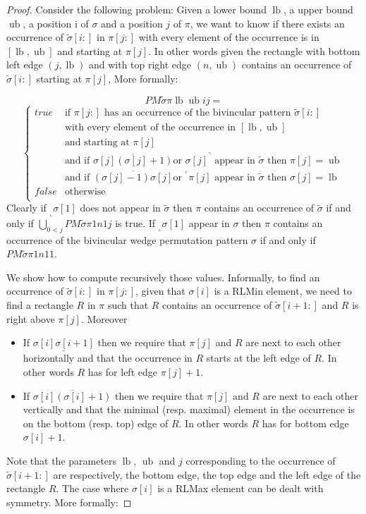 \documentclass[a4paper]{llncs}
\newcommand{\ptext}{\pi}
\newcommand{\PM}{PM}
\DeclareMathOperator{\lb}{lb}
\DeclareMathOperator{\ub}{ub}
\begin{document}
\begin{proof}
Consider the following problem:
Given a lower bound $\lb$, a upper bound $\ub$, a position i of $\sigma$
and a position $j$ of $\pi$, we want to know if
there exists an occurrence of $\widetilde{\sigma}[i:]$ in $\ptext[j:]$
with every element of the occurrence is in $[\lb,\ub]$
and starting at $\pi[j]$.
In other words given the rectangle with bottom left edge
$(j,\lb)$ and with top right edge $(n,\ub)$
contains an occurrence of $\widetilde{\sigma}[i:]$
starting at $\pi[j]$,
More formally:

$$
\PM{\widetilde{\sigma}}{\ptext}{\lb}{\ub}{i}{j}=
$$
$$
\begin{cases}
	true 	& \text{if $\ptext[j:]$ has an occurrence of the bivincular pattern $\widetilde{\sigma}[i:]$ }\\
			& \text{with every element of the occurrence in $[\lb,\ub]$}\\
			& \text{and starting at $\pi[j]$}\\
			& \text{and if $\overline{\sigma[j](\sigma[j]+1)}$
			 or $\sigma[j]^\urcorner$ appear in $\widetilde{\sigma}$ then $\pi[j]=\ub$} \\
			& \text{and if $\overline{(\sigma[j]-1)\sigma[j]}$
			 or $^\ulcorner{\pi[j]}$ appear in $\widetilde{\sigma}$ then $\sigma[j]=\lb$} \\
	false 	& \text{otherwise}\\
\end{cases}
$$
Clearly if $_\llcorner{\sigma[1]}$ does not appear in $\widetilde{\sigma}$
then $\pi$ contains an occurrence of $\widetilde{\sigma}$
if and only if $\bigcup_{0<j} \PM{\widetilde{\sigma}}{\ptext}{1}{n}{1}{j}$ is true.
If $_\llcorner{\sigma[1]}$ appear in $\sigma$ then
$\pi$ contains an occurrence of
the bivincular wedge permutation pattern $\sigma$
if and only if $\PM{\widetilde{\sigma}}{\ptext}{1}{n}{1}{1}$.

We show how to compute recursively those values.
Informally, to find an occurrence of $\widetilde{\sigma}[i:]$ in $\pi[j:]$,
given that $\sigma[i]$ is a RLMin element,
we need to find a rectangle $R$ in $\pi$
such that $R$ contains an occurrence of $\widetilde{\sigma}[i+1:]$
and $R$ is right above $\pi[j]$.
Moreover
\begin{itemize}
\item If $\underline{\sigma[i]\sigma[i+1]}$ then
we require that $\pi[j]$ and $R$ are next to each other horizontally
and that the occurrence in $R$ starts at the left edge of $R$.
In other words $R$ has for left edge $\pi[j]+1$.
\item If $\overline{\sigma[i](\sigma[i]+1)}$ then
we require that $\pi[j]$ and $R$ are next to each other vertically
and that the minimal (resp. maximal) element in the occurrence
is on the bottom (resp. top) edge of $R$.
In other words $R$ has for bottom edge $\sigma[i]+1$.
\end{itemize}
Note that the parameters $\lb$, $\ub$ and $j$ corresponding
to the occurrence of $\widetilde{\sigma}[i+1:]$ are respectively,
the bottom edge, the top edge and the left edge of the rectangle $R$.
The case where $\sigma[i]$ is a RLMax element can be dealt with symmetry.
More formally:


\end{proof}
\end{document}

